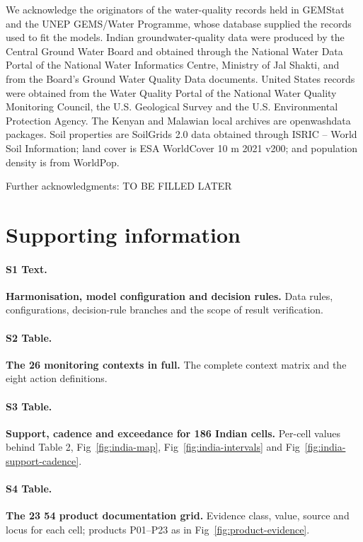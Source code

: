 \documentclass[10pt,letterpaper]{article}
\begin{document}
We acknowledge the originators of the water-quality records held in GEMStat and the UNEP GEMS/Water Programme, whose database supplied the records used to fit the models. Indian groundwater-quality data were produced by the Central Ground Water Board and obtained through the National Water Data Portal of the National Water Informatics Centre, Ministry of Jal Shakti, and from the Board's Ground Water Quality Data documents. United States records were obtained from the Water Quality Portal of the National Water Quality Monitoring Council, the U.S. Geological Survey and the U.S. Environmental Protection Agency. The Kenyan and Malawian local archives are openwashdata packages. Soil properties are SoilGrids 2.0 data obtained through ISRIC -- World Soil Information; land cover is ESA WorldCover 10 m 2021 v200; and population density is from WorldPop.

Further acknowledgments: TO BE FILLED LATER

\section*{Supporting information}

\paragraph*{S1 Text.}
\label{S1_Text}
\textbf{Harmonisation, model configuration and decision rules.} Data rules, configurations, decision-rule branches and the scope of result verification.

\paragraph*{S2 Table.}
\label{S2_Table}
\textbf{The 26 monitoring contexts in full.} The complete context matrix and the eight action definitions.

\paragraph*{S3 Table.}
\label{S3_Table}
\textbf{Support, cadence and exceedance for 186 Indian cells.} Per-cell values behind Table 2, Fig~\ref{fig:india-map}, Fig~\ref{fig:india-intervals} and Fig~\ref{fig:india-support-cadence}.

\paragraph*{S4 Table.}
\label{S4_Table}
\textbf{The 23 \texttimes{} 54 product documentation grid.} Evidence class, value, source and locus for each cell; products P01--P23 as in Fig~\ref{fig:product-evidence}.
\end{document}
